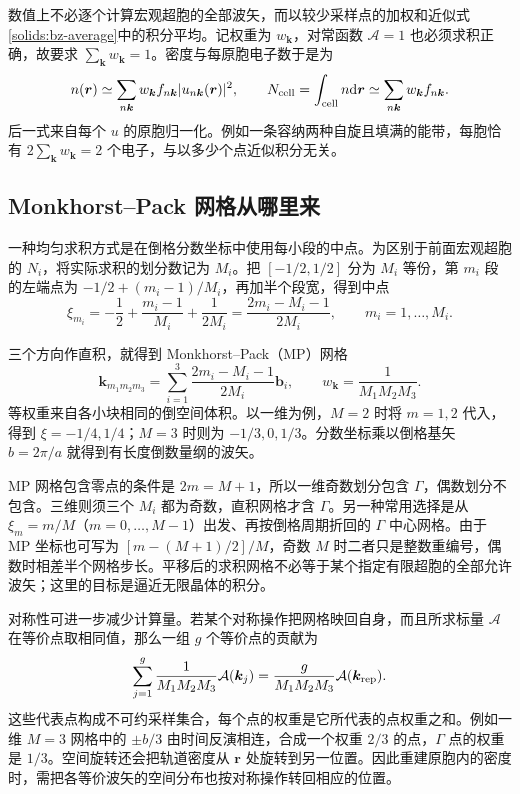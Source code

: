 数值上不必逐个计算宏观超胞的全部波矢，而以较少采样点的加权和近似式\eqref{solids:bz-average}中的积分平均。记权重为 $w_{\bm k}$，对常函数 $\mathcal A=1$ 也必须求积正确，故要求 $\sum_{\bm k}w_{\bm k}=1$。密度与每原胞电子数于是为
\begin{equation}\label{solids:density-kmesh}
n(\bm r)\simeq\sum_{n\bm k}w_{\bm k}f_{n\bm k}|u_{n\bm k}(\bm r)|^2,
\qquad N_{\rm cell}=\int_{\rm cell}n\mathrm{d}\bm r
\simeq\sum_{n\bm k}w_{\bm k}f_{n\bm k}.
\end{equation}
后一式来自每个 $u$ 的原胞归一化。例如一条容纳两种自旋且填满的能带，每胞恰有 $2\sum_{\bm k}w_{\bm k}=2$ 个电子，与以多少个点近似积分无关。

\begin{samepage}
\subsection{Monkhorst--Pack 网格从哪里来}
一种均匀求积方式是在倒格分数坐标中使用每小段的中点。为区别于前面宏观超胞的 $N_i$，将实际求积的划分数记为 $M_i$。把 $[-1/2,1/2]$ 分为 $M_i$ 等份，第 $m_i$ 段的左端点为 $-1/2+(m_i-1)/M_i$，再加半个段宽，得到中点
\begin{equation}
\xi_{m_i}=-\frac12+\frac{m_i-1}{M_i}+\frac1{2M_i}
=\frac{2m_i-M_i-1}{2M_i},\qquad m_i=1,\ldots,M_i.
\end{equation}
\end{samepage}
三个方向作直积，就得到 Monkhorst--Pack（MP）网格
\begin{equation}\label{solids:mp-mesh}
\bm k_{m_1m_2m_3}=\sum_{i=1}^3\frac{2m_i-M_i-1}{2M_i}\bm b_i,
\qquad w_{\bm k}=\frac1{M_1M_2M_3}.
\end{equation}
等权重来自各小块相同的倒空间体积。以一维为例，$M=2$ 时将 $m=1,2$ 代入，得到 $\xi=-1/4,1/4$；$M=3$ 时则为 $-1/3,0,1/3$。分数坐标乘以倒格基矢 $b=2\pi/a$ 就得到有长度倒数量纲的波矢。

MP 网格包含零点的条件是 $2m=M+1$，所以一维奇数划分包含 $\Gamma$，偶数划分不包含。三维则须三个 $M_i$ 都为奇数，直积网格才含 $\Gamma$。另一种常用选择是从 $\xi_m=m/M$（$m=0,\ldots,M-1$）出发、再按倒格周期折回的 $\Gamma$ 中心网格。由于 MP 坐标也可写为 $[m-(M+1)/2]/M$，奇数 $M$ 时二者只是整数重编号，偶数时相差半个网格步长。平移后的求积网格不必等于某个指定有限超胞的全部允许波矢；这里的目标是逼近无限晶体的积分。

对称性可进一步减少计算量。若某个对称操作把网格映回自身，而且所求标量 $\mathcal A$ 在等价点取相同值，那么一组 $g$ 个等价点的贡献为
\begin{equation}
\sum_{j=1}^{g}\frac1{M_1M_2M_3}\mathcal A(\bm k_j)
=\frac{g}{M_1M_2M_3}\mathcal A(\bm k_{\rm rep}).
\end{equation}
这些代表点构成不可约采样集合，每个点的权重是它所代表的点权重之和。例如一维 $M=3$ 网格中的 $\pm b/3$ 由时间反演相连，合成一个权重 $2/3$ 的点，$\Gamma$ 点的权重是 $1/3$。空间旋转还会把轨道密度从 $\bm r$ 处旋转到另一位置。因此重建原胞内的密度时，需把各等价波矢的空间分布也按对称操作转回相应的位置。

